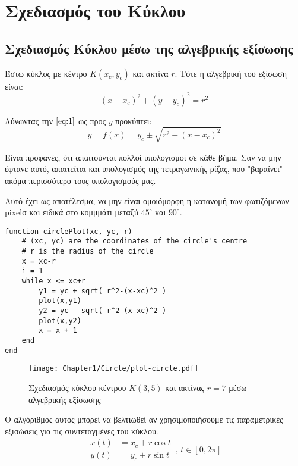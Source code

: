 \section{Σχεδιασμός του Κύκλου}
\subsection{Σχεδιασμός Κύκλου μέσω της αλγεβρικής εξίσωσης}

Έστω κύκλος με κέντρο $K(x_c, y_c)$ και ακτίνα $r$. Τότε η αλγεβρική του εξίσωση είναι:
\begin{equation}
	(x-x_c)^2 + (y-y_c)^2 = r^2
	\label{eq:1}
\end{equation}

Λύνωντας την $\eqref{eq:1}$ ως προς $y$ προκύπτει:
\[
	y = f(x) = y_c \pm \sqrt{r^2- (x-x_c)^2}
\]

Είναι προφανές, ότι απαιτούνται πολλοί υπολογισμοί σε κάθε βήμα. Σαν να μην έφτανε αυτό, απαιτείται και υπολογισμός της τετραγωνικής ρίζας, που "βαραίνει" ακόμα περισσότερο τους υπολογισμούς μας.

Αυτό έχει ως αποτέλεσμα, να μην είναι ομοιόμορφη η κατανομή των φωτιζόμενων pixelσ και ειδικά στο κομμμάτι μεταξύ $45^\circ$ και $90^\circ$.

\begin{lstlisting}[caption={Αλγόριθμος Σχεδιασμού κύκλου μέσω αλγεβρικής εξίσωσης}]
function circlePlot(xc, yc, r)
	# (xc, yc) are the coordinates of the circle's centre
	# r is the radius of the circle
	x = xc-r 
    i = 1
	while x <= xc+r
        y1 = yc + sqrt( r^2-(x-xc)^2 )
        plot(x,y1)
        y2 = yc - sqrt( r^2-(x-xc)^2 )
        plot(x,y2)
        x = x + 1 
	end
end
\end{lstlisting}


\begin{figure}[hbt]
  \begin{center}
	\texttt{[image: Chapter1/Circle/plot-circle.pdf]}
  \end{center}
  \caption{Σχεδιασμός κύκλου κέντρου $K(3,5)$ και ακτίνας $r=7$ μέσω αλγεβρικής εξίσωσης}
\end{figure}

Ο αλγόριθμος αυτός μπορεί να βελτιωθεί αν χρησιμοποιήσουμε τις παραμετρικές εξισώσεις για τις συντεταγμένες του κύκλου.
\begin{equation*}
	  \left.\begin{aligned}
	  x(t) &= x_c + r\cos{t}\\
	  y(t) &= y_c + r\sin{t}
	\end{aligned}\right. \, , \, t \in [0, 2\pi]
\end{equation*}

